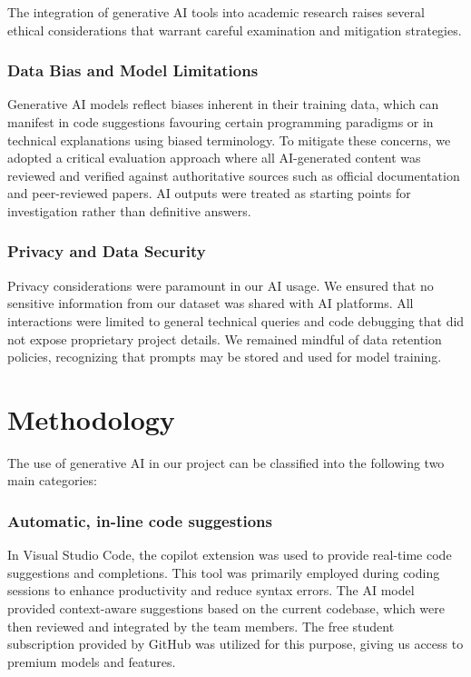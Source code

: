 \documentclass{article}
\begin{document}
The integration of generative AI tools into academic research raises several ethical considerations that warrant careful examination and mitigation strategies.

\subsubsection*{Data Bias and Model Limitations}

Generative AI models reflect biases inherent in their training data, which can manifest in code suggestions favouring certain programming paradigms or in technical explanations using biased terminology. To mitigate these concerns, we adopted a critical evaluation approach where all AI-generated content was reviewed and verified against authoritative sources such as official documentation and peer-reviewed papers. AI outputs were treated as starting points for investigation rather than definitive answers.

\subsubsection*{Privacy and Data Security}

Privacy considerations were paramount in our AI usage. We ensured that no sensitive information from our dataset was shared with AI platforms. All interactions were limited to general technical queries and code debugging that did not expose proprietary project details. We remained mindful of data retention policies, recognizing that prompts may be stored and used for model training.

\section{Methodology}
The use of generative AI in our project can be classified into the following two main categories:
\subsubsection*{Automatic, in-line code suggestions}
In Visual Studio Code, the copilot extension was used to provide real-time code suggestions and completions. This tool was primarily employed during coding sessions to enhance productivity and reduce syntax errors. The AI model provided context-aware suggestions based on the current codebase, which were then reviewed and integrated by the team members. The free student subscription provided by GitHub was utilized for this purpose, giving us access to premium models and features.
\end{document}
